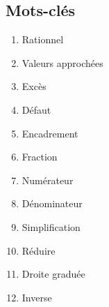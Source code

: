 \documentclass[../../syllabus_1.tex]{subfiles}
\begin{document}
\begin{itemize}
\section*{Mots-clés}
\begin{enumerate}[cols=2, label=\textbf{\arabic*.}]
    \item Rationnel
    \item Valeurs approchées
    \item Excès
    \item Défaut
    \item Encadrement
    \item Fraction
    \item Numérateur
    \item Dénominateur
    \item Simplification
    \item Réduire
    \item Droite graduée
    \item Inverse
\end{enumerate}


\end{itemize}
\end{document}
